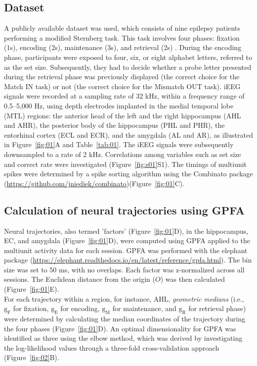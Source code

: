 \documentclass[final,3p,times,twocolumn]{elsarticle}
\begin{document}
\subsection{Dataset}
A publicly available dataset \cite{boran_dataset_2020} was used, which consists of nine epilepsy patients performing a modified Sternberg task. This task involves four phases: fixation (1s), encoding (2s), maintenance (3s), and retrieval (2s) \cite{boran_dataset_2020}. During the encoding phase, participants were exposed to four, six, or eight alphabet letters, referred to as the set size. Subsequently, they had to decide whether a probe letter presented during the retrieval phase was previously displayed (the correct choice for the Match IN task) or not (the correct choice for the Mismatch OUT task). iEEG signals were recorded at a sampling rate of 32 kHz, within a frequency range of 0.5--5,000 Hz, using depth electrodes implanted in the medial temporal lobe (MTL) regions: the anterior head of the left and the right hippocampus (AHL and AHR), the posterior body of the hippocampus (PHL and PHR), the entorhinal cortex (ECL and ECR), and the amygdala (AL and AR), as illustrated in Figure~\ref{fig:01}A and Table~\ref{tab:01}. The iEEG signals were subsequently downsampled to a rate of 2 kHz. Correlations among variables such as set size and correct rate were investigated (Figure~\ref{fig:s01}S1). The timings of multiunit spikes were determined by a spike sorting algorithm \cite{niediek_reliable_2016} using the Combinato package (\url{https://github.com/jniediek/combinato})(Figure~\ref{fig:01}C).

\subsection{Calculation of neural trajectories using GPFA}
Neural trajectories, also termed 'factors' (Figure~\ref{fig:01}D), in the hippocampus, EC, and amygdala (Figure~\ref{fig:01}D), were computed using GPFA \cite{yu_gaussian-process_2009} applied to the multiunit activity data for each session. GPFA was performed with the elephant package (\url{https://elephant.readthedocs.io/en/latest/reference/gpfa.html}). The bin size was set to 50 ms, with no overlaps. Each factor was z-normalized across all sessions. The Euclidean distance from the origin ($O$) was then calculated (Figure~\ref{fig:01}E).
\\
\indent
For each trajectory within a region, for instance, AHL, \textit{geometric medians} (i.e., $\mathrm{g_{F}}$ for fixation, $\mathrm{g_{E}}$ for encoding, $\mathrm{g_{M}}$ for maintenance, and $\mathrm{g_{R}}$ for retrieval phase) were determined by calculating the median coordinates of the trajectory during the four phases (Figure~\ref{fig:01}D). An optimal dimensionality for GPFA was identified as three using the elbow method, which was derived by investigating the log-likelihood values through a three-fold cross-validation approach (Figure~\ref{fig:02}B).
\end{document}
